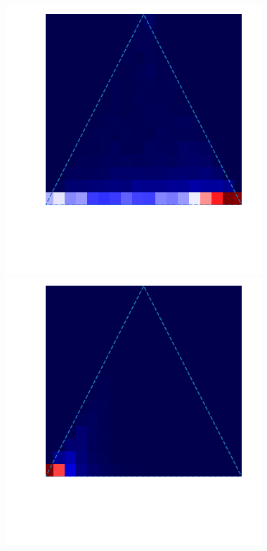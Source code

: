 \begin{figure}
 \begin{minipage}[]{.3\textwidth}
    \includegraphics[width=\textwidth]{triangle_1kld.png}
\subcaption{}
\end{minipage}
 \begin{minipage}{.3\textwidth}
    \includegraphics[width=\textwidth]{triangle_1elbo.png}

\end{minipage}
\end{figure}
